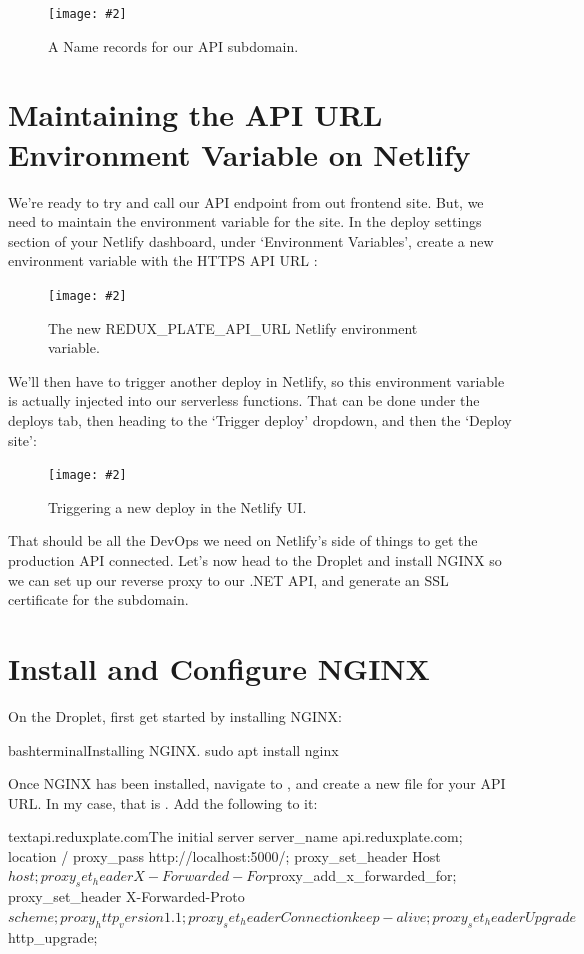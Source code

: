\documentclass[a4paper,headinclude=on,footinclude=on,12pt,oneside]{scrbook}
\newcommand{\standardfigure}[3]{\begin{figure}[H]\begin{center}\texttt{[image: \#2]}\caption{#3}\label{fig:#2}\end{center}\end{figure}}
\begin{document}
\standardfigure{\textwidth}{frontend/netlify/api-a-name-record}{A Name records for our API subdomain.}

\section{Maintaining the API URL Environment Variable on Netlify}

We're ready to try and call our API endpoint from out frontend site. But, we need to maintain the environment variable  for the site. In the deploy settings section of your Netlify dashboard, under `Environment Variables', create a new environment variable with the HTTPS API URL :

\standardfigure{\textwidth}{frontend/netlify/new-api-url-variable}{The new REDUX\_PLATE\_API\_URL Netlify environment variable.}

We'll then have to trigger another deploy in Netlify, so this environment variable is actually injected into our serverless functions. That can be done under the deploys tab, then heading to the `Trigger deploy' dropdown, and then the `Deploy site':

\standardfigure{\textwidth}{frontend/netlify/trigger-new-deploy}{Triggering a new deploy in the Netlify UI.}

That should be all the DevOps we need on Netlify's side of things to get the production API connected. Let's now head to the Droplet and install NGINX so we can set up our reverse proxy to our .NET API, and generate an SSL certificate for the subdomain.

\section{Install and Configure NGINX}

On the Droplet, first get started by installing NGINX:

\begin{codeInput}{bash}{terminal}{Installing NGINX.}
sudo apt install nginx
\end{codeInput}

Once NGINX has been installed, navigate to , and create a new file for your API URL. In my case, that is . Add the following to it:

\begin{codeInput}{text}{api.reduxplate.com}{The initial }
server {
  server_name api.reduxplate.com;
  location / {
    proxy_pass http://localhost:5000/;
    proxy_set_header   Host $host;
    proxy_set_header   X-Forwarded-For $proxy_add_x_forwarded_for;
    proxy_set_header   X-Forwarded-Proto $scheme;
    proxy_http_version 1.1;
    proxy_set_header   Connection keep-alive;
    proxy_set_header   Upgrade $http_upgrade;
  }
}
\end{codeInput}
\end{document}
